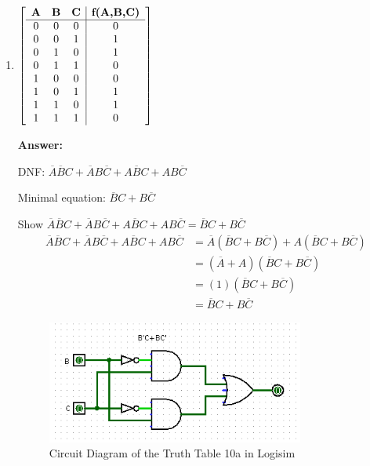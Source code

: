 \documentclass[12pt]{article}
\begin{document}
\begin{enumerate}
    \begin{enumerate}
      \item
      \noindent
      $\displaystyle
      \left[
        \begin{array}{c c c|c}
          \textbf{A} & \textbf{B} & \textbf{C} & \textbf{f(A,B,C)} \\
          \hline
          0 & 0 & 0 & 0 \\
          0 & 0 & 1 & 1 \\
          0 & 1 & 0 & 1 \\
          0 & 1 & 1 & 0 \\
          1 & 0 & 0 & 0 \\
          1 & 0 & 1 & 1 \\
          1 & 1 & 0 & 1 \\
          1 & 1 & 1 & 0
        \end{array}
      \right]$

      \vspace{2em}
      \textbf{Answer:}
      \begin{Karnaughvuit}
      \end{Karnaughvuit}

      DNF: $\overline{A}\overline{B}C + \overline{A}B\overline{C} + A\overline{B}C + AB\overline{C}$

      Minimal equation: $\overline{B}C + B\overline{C}$

      Show $\overline{A}\overline{B}C + \overline{A}B\overline{C} + A\overline{B}C + AB\overline{C} = \overline{B}C + B\overline{C}$
      \begin{align*}
        \overline{A}\overline{B}C + \overline{A}B\overline{C} + A\overline{B}C + AB\overline{C} &= \overline{A}(\overline{B}C + B\overline{C}) + A(\overline{B}C + B\overline{C}) \\
        &= (\overline{A}+A)(\overline{B}C + B\overline{C})\\
        &=(1)(\overline{B}C + B\overline{C})\\
        &=\overline{B}C + B\overline{C}
      \end{align*}

      \begin{figure}[h]
        \centering
        \includegraphics[width=0.8\textwidth]{assn/02/media/10a.png}
        \caption{Circuit Diagram of the Truth Table 10a in Logisim}
      \end{figure}


\end{enumerate}
\end{enumerate}
\end{document}
